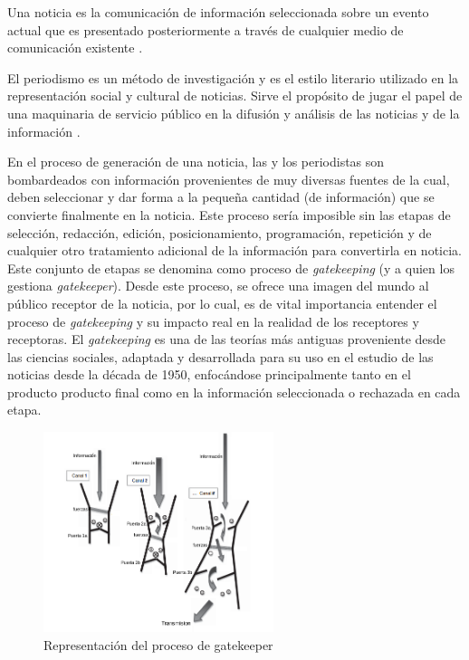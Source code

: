 \label{sec:definicion_problema}

Una noticia es la comunicación de información seleccionada sobre un evento actual que es presentado posteriormente a través de cualquier medio de comunicación existente \cite{Shirky_2008_Herecomes}.

El periodismo es un método de investigación y es el estilo literario utilizado en la representación social y cultural de noticias. Sirve el propósito de jugar el papel de una maquinaria de servicio público en la difusión y análisis de las noticias y de la información \cite{harcup2004journalism}. 

En el proceso de generación de una noticia, las y los periodistas son bombardeados con información provenientes de muy diversas fuentes de la cual, deben seleccionar y dar forma a la pequeña cantidad (de información) que se convierte finalmente en la noticia. Este proceso sería imposible sin las etapas de selección, redacción, edición, posicionamiento, programación, repetición y de cualquier otro tratamiento adicional de la información para convertirla en noticia. Este conjunto de etapas se denomina como proceso de \emph{gatekeeping} (y a quien los gestiona \emph{gatekeeper}). Desde este proceso, se ofrece una imagen del mundo al público receptor de la noticia, por lo cual, es de vital importancia  entender el proceso de \emph{gatekeeping} y su impacto real en la realidad de los receptores y receptoras. El \emph{gatekeeping} es una de las teorías más antiguas proveniente desde las ciencias sociales, adaptada y desarrollada para su uso en el estudio de las noticias desde la década de 1950, enfocándose principalmente tanto en el producto producto final como en la información seleccionada o rechazada en cada etapa.

\begin{figure}[H]
  \centering
    \includegraphics[width=0.6\textwidth]{imgs/gatekeeper.png}
  \caption{Representación del proceso de gatekeeper \cite{wahl2008handbook}}
  \label{fig:gatekeeper}
\end{figure}


